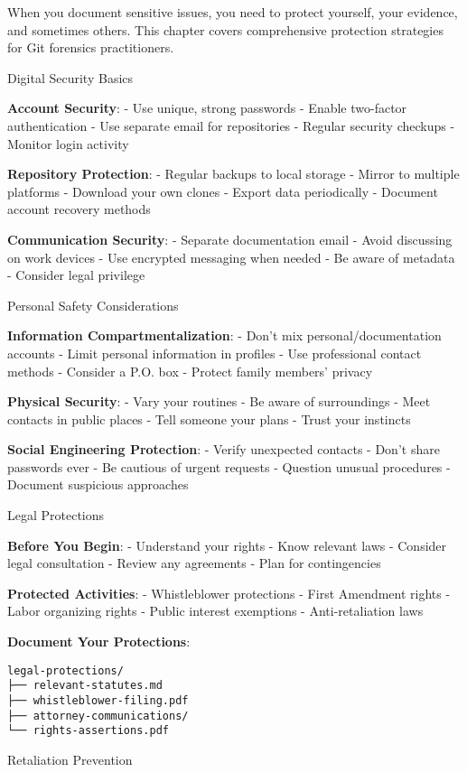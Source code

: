 When you document sensitive issues, you need to protect yourself, your
evidence, and sometimes others. This chapter covers comprehensive
protection strategies for Git forensics practitioners.

Digital Security Basics

\textbf{Account Security}: - Use unique, strong passwords - Enable
two-factor authentication - Use separate email for repositories -
Regular security checkups - Monitor login activity

\textbf{Repository Protection}: - Regular backups to local storage -
Mirror to multiple platforms - Download your own clones - Export data
periodically - Document account recovery methods

\textbf{Communication Security}: - Separate documentation email - Avoid
discussing on work devices - Use encrypted messaging when needed - Be
aware of metadata - Consider legal privilege

Personal Safety Considerations

\textbf{Information Compartmentalization}: - Don't mix
personal/documentation accounts - Limit personal information in profiles
- Use professional contact methods - Consider a P.O. box - Protect
family members' privacy

\textbf{Physical Security}: - Vary your routines - Be aware of
surroundings - Meet contacts in public places - Tell someone your plans
- Trust your instincts

\textbf{Social Engineering Protection}: - Verify unexpected contacts -
Don't share passwords ever - Be cautious of urgent requests - Question
unusual procedures - Document suspicious approaches

Legal Protections

\textbf{Before You Begin}: - Understand your rights - Know relevant laws
- Consider legal consultation - Review any agreements - Plan for
contingencies

\textbf{Protected Activities}: - Whistleblower protections - First
Amendment rights - Labor organizing rights - Public interest exemptions
- Anti-retaliation laws

\textbf{Document Your Protections}:

\begin{verbatim}
legal-protections/
├── relevant-statutes.md
├── whistleblower-filing.pdf
├── attorney-communications/
└── rights-assertions.pdf
\end{verbatim}

Retaliation Prevention

